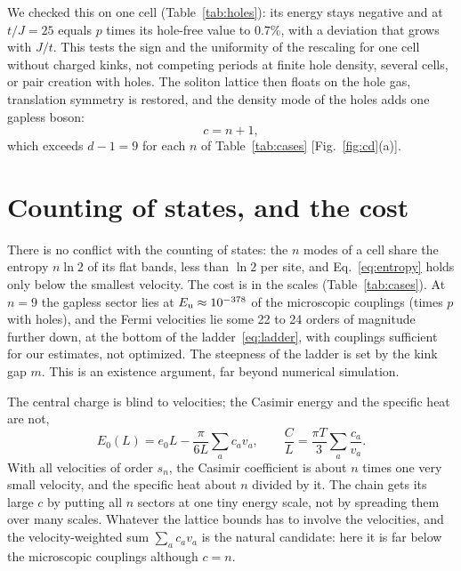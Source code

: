 \documentclass[11pt]{article}
\newcommand{\Eu}{E_{\rm u}}
\begin{document}
We checked this on one cell (Table~\ref{tab:holes}): its energy stays negative and at $t/J=25$ equals $p$ times its hole-free value to $0.7\%$, with a deviation that grows with $J/t$. This tests the sign and the uniformity of the rescaling for one cell without charged kinks, not competing periods at finite hole density, several cells, or pair creation with holes. The soliton lattice then floats on the hole gas, translation symmetry is restored, and the density mode of the holes adds one gapless boson:
\begin{equation}
c=n+1,
\label{eq:cn1}
\end{equation}
which exceeds $d-1=9$ for each $n$ of Table~\ref{tab:cases} [Fig.~\ref{fig:cd}(a)].

\section{Counting of states, and the cost}

There is no conflict with the counting of states: the $n$ modes of a cell share the entropy $n\ln2$ of its flat bands, less than $\ln2$ per site, and Eq.~\eqref{eq:entropy} holds only below the smallest velocity. The cost is in the scales (Table~\ref{tab:cases}). At $n=9$ the gapless sector lies at $\Eu\approx10^{-378}$ of the microscopic couplings (times $p$ with holes), and the Fermi velocities lie some 22 to 24 orders of magnitude further down, at the bottom of the ladder~\eqref{eq:ladder}, with couplings sufficient for our estimates, not optimized. The steepness of the ladder is set by the kink gap $m$. This is an existence argument, far beyond numerical simulation.

The central charge is blind to velocities; the Casimir energy and the specific heat are not,
\begin{equation}
E_0(L)=e_0L-\frac{\pi}{6L}\sum_ac_av_a,\qquad \frac{C}{L}=\frac{\pi T}{3}\sum_a\frac{c_a}{v_a}.
\label{eq:casimir}
\end{equation}
With all velocities of order $s_n$, the Casimir coefficient is about $n$ times one very small velocity, and the specific heat about $n$ divided by it. The chain gets its large $c$ by putting all $n$ sectors at one tiny energy scale, not by spreading them over many scales. Whatever the lattice bounds has to involve the velocities, and the velocity-weighted sum $\sum_ac_av_a$ is the natural candidate: here it is far below the microscopic couplings although $c=n$.
\end{document}
